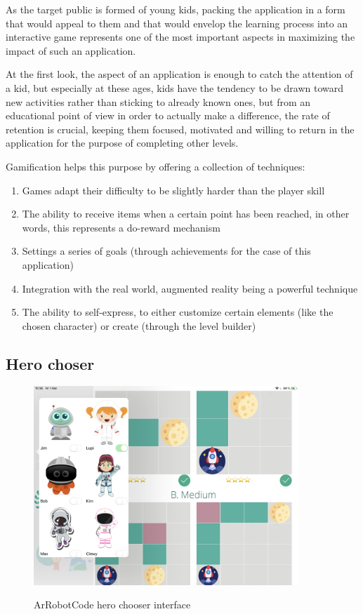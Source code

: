 \documentclass[12 pct]{report}
\begin{document}
As the target public is formed of young kids, packing the application in a form that would appeal to them and that would envelop the learning process into an interactive game represents one of the most important aspects in maximizing the impact of such an application. 

At the first look, the aspect of an application is enough to catch the attention of a kid, but especially at these ages, kids have the tendency to be drawn toward new activities rather than sticking to already known ones, but from an educational point of view in order to actually make a difference, the rate of retention is crucial, keeping them focused, motivated and willing to return in the application for the purpose of completing other levels.


Gamification helps this purpose by offering a collection of techniques:

\begin{enumerate}
\item Games adapt their difficulty to be slightly harder than the player skill
\item The ability to receive items when a certain point has been reached, in other words, this represents a do-reward mechanism
\item Settings a series of goals (through achievements for the case of this application)
\item Integration with the real world, augmented reality being a powerful technique
\item The ability to self-express, to either customize certain elements (like the chosen character) or create (through the level builder)
\end{enumerate}
\subsection*{Hero choser}
\begin{figure}[H]
\includegraphics[width=0.89\textwidth]{ArRobotCode1}
\centering
\label{fig:feature-points}
\caption{ArRobotCode hero chooser interface}
\end{figure}
\end{document}
